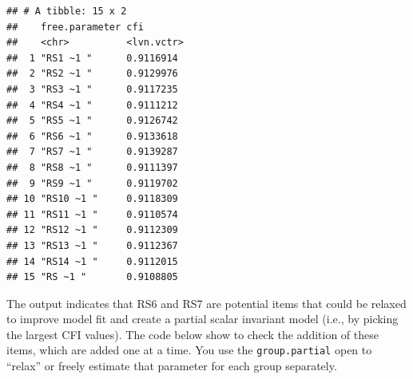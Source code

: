 \documentclass[
  man]{apa7}
\newenvironment{Shaded}{\begin{snugshade}}{\end{snugshade}}
\newcommand{\AttributeTok}[1]{\textcolor[rgb]{0.13,0.29,0.53}{#1}}
\newcommand{\CommentTok}[1]{\textcolor[rgb]{0.56,0.35,0.01}{\textit{#1}}}
\newcommand{\FunctionTok}[1]{\textcolor[rgb]{0.13,0.29,0.53}{\textbf{#1}}}
\newcommand{\NormalTok}[1]{#1}
\newcommand{\OtherTok}[1]{\textcolor[rgb]{0.56,0.35,0.01}{#1}}
\newcommand{\SpecialCharTok}[1]{\textcolor[rgb]{0.81,0.36,0.00}{\textbf{#1}}}
\newcommand{\StringTok}[1]{\textcolor[rgb]{0.31,0.60,0.02}{#1}}
\begin{document}
\small

\begin{Shaded}
\end{Shaded}

\normalsize

\begin{verbatim}
## # A tibble: 15 x 2
##    free.parameter cfi       
##    <chr>          <lvn.vctr>
##  1 "RS1 ~1 "      0.9116914 
##  2 "RS2 ~1 "      0.9129976 
##  3 "RS3 ~1 "      0.9117235 
##  4 "RS4 ~1 "      0.9111212 
##  5 "RS5 ~1 "      0.9126742 
##  6 "RS6 ~1 "      0.9133618 
##  7 "RS7 ~1 "      0.9139287 
##  8 "RS8 ~1 "      0.9111397 
##  9 "RS9 ~1 "      0.9119702 
## 10 "RS10 ~1 "     0.9118309 
## 11 "RS11 ~1 "     0.9110574 
## 12 "RS12 ~1 "     0.9112309 
## 13 "RS13 ~1 "     0.9112367 
## 14 "RS14 ~1 "     0.9112015 
## 15 "RS ~1 "       0.9108805
\end{verbatim}

The output indicates that RS6 and RS7 are potential items that could be relaxed to improve model fit and create a partial scalar invariant model (i.e., by picking the largest CFI values). The code below show to check the addition of these items, which are added one at a time. You use the \texttt{group.partial} open to ``relax'' or freely estimate that parameter for each group separately.

\small
\end{document}
